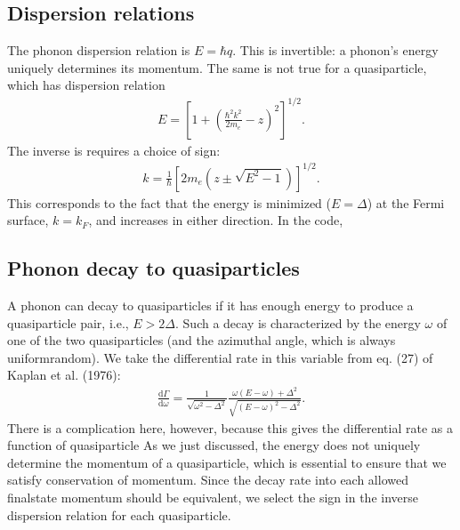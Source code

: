 \documentclass[letterpaper,10pt,english]{sphinxmanual}
\begin{document}
\subsection{Dispersion relations}
\label{\detokenize{kinematics:dispersion-relations}}
The phonon dispersion relation is \(E=\hbar q\). This is invertible: a phonon’s energy uniquely determines its momentum. The same is not true for a quasiparticle, which has dispersion relation
\begin{equation*}
\begin{split}E = \left[1 + \left(\frac{\hbar^2 k^2}{2m_e} - z\right)^2\right]^{1/2}.\end{split}
\end{equation*}
The inverse is requires a choice of sign:
\begin{equation*}
\begin{split}k = \frac{1}{\hbar}\left[
        2m_e\left(
            z \pm\sqrt{E^2 - 1}
        \right)
    \right]^{1/2}.\end{split}
\end{equation*}
This corresponds to the fact that the energy is minimized (\(E=\Delta\)) at the Fermi surface, \(k=k_F\), and increases in either direction. In the code, 


\subsection{Phonon decay to quasiparticles}
\label{\detokenize{kinematics:phonon-decay-to-quasiparticles}}
A phonon can decay to quasiparticles if it has enough energy to produce a quasiparticle pair, i.e., \(E>2\Delta\). Such a decay is characterized by the energy \(\omega\) of one of the two quasiparticles (and the azimuthal angle, which is always uniform\sphinxhyphen{}random). We take the differential rate in this variable from eq. (27) of Kaplan et al. (1976):
\begin{equation*}
\begin{split}\frac{\mathrm d\Gamma}{\mathrm d\omega} =
    \frac{1}{\sqrt{\omega^2 - \Delta^2}}
    \frac{\omega\left(E-\omega\right) + \Delta^2}
         {\sqrt{(E-\omega)^2 - \Delta^2}}
.\end{split}
\end{equation*}
There is a complication here, however, because this gives the differential rate as a function of quasiparticle  As we just discussed, the energy does not uniquely determine the momentum of a quasiparticle, which is essential to ensure that we satisfy conservation of momentum. Since the decay rate into each allowed final\sphinxhyphen{}state momentum should be equivalent, we  select the sign in the inverse dispersion relation for each quasiparticle.
\end{document}

